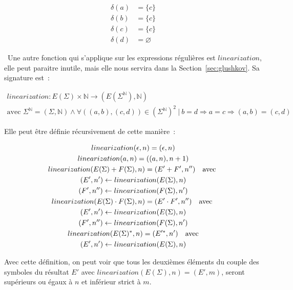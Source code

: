 \documentclass[12pt]{article}
\begin{document}
\begin{align*}
    \delta(a) & = \{c\}       \\
    \delta(b) & = \{c\}       \\
    \delta(c) & = \{c\}       \\
    \delta(d) & = \varnothing
\end{align*}

\textbullet~Une autre fonction qui s'applique sur les expressions régulières
est \(linearization\), elle peut paraitre inutile, mais elle nous servira dans
la Section~\ref{sec:glushkov}. Sa signature est~:

\begin{gather*}
    linearization: E(\Sigma) \times \mathbb{N} \to (E(\Sigma^{\mathbb{N}}), \mathbb{N}) \\
    \text{avec } \Sigma^{\mathbb{N}} = (\Sigma, \mathbb{N}) \land \forall ((a, b), (c, d)) \in (\Sigma^{\mathbb{N}})^2 ~|~ b = d \Rightarrow a = c \Rightarrow (a, b) = (c, d)
\end{gather*}

Elle peut être définie récursivement de cette manière~:

\begin{gather}
    linearization(\epsilon, n) = (\epsilon, n) \\
    linearization(a, n) = ((a, n), n + 1) \\
    linearization(E(\Sigma) + F(\Sigma), n) = (E' + F', n'') \quad \text{avec } \\
    (E', n') \leftarrow linearization(E(\Sigma), n) \notag \\
    (F', n'') \leftarrow linearization(F(\Sigma), n') \notag \\
    linearization(E(\Sigma) \cdot F(\Sigma), n) = (E' \cdot F', n'') \quad
    \text{avec } \\
    (E', n') \leftarrow linearization(E(\Sigma), n) \notag \\
    (F', n'') \leftarrow linearization(F(\Sigma), n') \notag \\
    linearization(E(\Sigma)^*, n) = (E'^*, n') \quad \text{avec} \\
    (E', n') \leftarrow linearization(E(\Sigma), n) \notag
\end{gather}

Avec cette définition, on peut voir que tous les deuxièmes éléments du couple
des symboles du résultat \(E'\) avec \(linearization(E(\Sigma), n) = (E', m)\),
seront supérieurs ou égaux à \(n\) et inférieur strict à \(m\).
\end{document}
